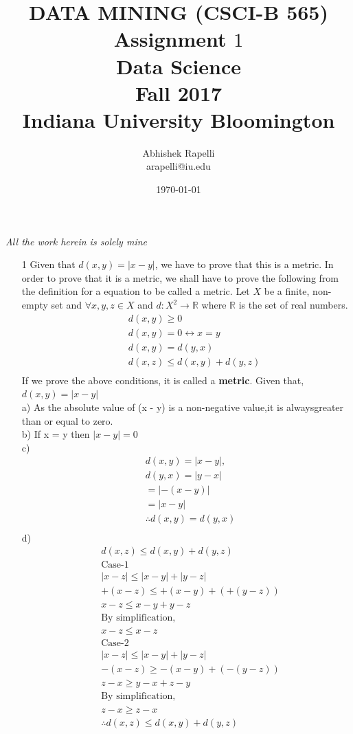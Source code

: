 \documentclass[12pt]{article}
\title{ DATA MINING (CSCI-B 565)  \\
Assignment $1$ \\
Data Science \\Fall 2017\\Indiana University Bloomington}
\author {Abhishek Rapelli \\ arapelli@iu.edu}
\date{\today}
\begin{document}
\maketitle
\begin{center}
\textit{All the work herein is solely mine}
\end{center}
\begin{enumerate}
\item[1] Given that $d(x,y) = |x - y|$, we have to prove that this is a metric. In order to prove that it is a metric, we shall have to prove the following from the definition for a equation to be called a metric.
Let $X$ be a finite, non-empty set and $\forall x,y,z\in X$ and $d:X^2\rightarrow\mathbb{R}$ where $\mathbb{R}$ is the set of real numbers.
\begin{eqnarray*}
&&d(x,y) \geq 0  \\
&&d(x,y)  =  0 \leftrightarrow x = y \\
&&d(x,y) = d(y,x)  \\
&&d(x,z) \leq  d(x,y) + d(y,z) \\
\end{eqnarray*}
If we prove the above conditions, it is called a \textbf {metric}. 
Given that, $d(x,y) = |x - y|$ \\
a) As the absolute value of (x - y) is a non-negative value,it is alwaysgreater than or equal to zero. \\
b) If x = y then $|x - y| = 0$ \\
c) 
\begin{align*}
&d(x,y) = |x - y|, \\
& d(y,x) = |y-x| \\
&= | -(x-y)| \\
&= |x-y| \\
&\therefore d(x,y) = d(y,x) \\
\end{align*}
d)
\begin{align*}
&d(x,z) \leq d(x,y) + d(y,z) \\
&\text{Case-1}\\
& |x-z| \leq |x-y| + |y-z| \\
& +(x-z) \leq +(x-y) + (+(y-z)) \\
& x-z \leq  x-y + y - z \\
&\text{By simplification,}\\
& x-z \leq x-z \\
&\text{Case-2} \\
& |x-z| \leq |x-y| + |y-z| \\
& -(x-z) \geq -(x-y) + (-(y-z)) \\
& z-x \geq  y-x + z-y\\
&\text{By simplification,}\\
& z-x \geq z-x\\
&\therefore d(x,z) \leq d(x,y) + d(y,z) \\
\end{align*}


\end{enumerate}
\end{document}
